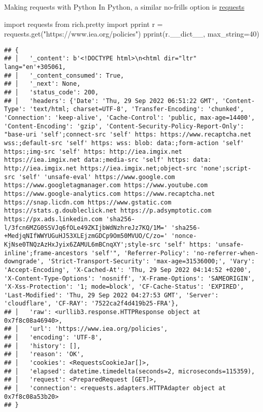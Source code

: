 \documentclass[
  10pt,
  ignorenonframetext,
  aspectratio=169]{beamer}
\newenvironment{Shaded}{\begin{snugshade}}{\end{snugshade}}
\newcommand{\DecValTok}[1]{\textcolor[rgb]{0.86,0.86,0.80}{#1}}
\newcommand{\ImportTok}[1]{\textcolor[rgb]{0.80,0.80,0.80}{#1}}
\newcommand{\NormalTok}[1]{\textcolor[rgb]{0.80,0.80,0.80}{#1}}
\newcommand{\OperatorTok}[1]{\textcolor[rgb]{0.94,0.94,0.82}{#1}}
\newcommand{\StringTok}[1]{\textcolor[rgb]{0.80,0.58,0.58}{#1}}
\begin{document}
\begin{frame}[fragile]{Making requests with Python}
\protect\hypertarget{making-requests-with-python}{}
In Python, a similar no-frills option is
\href{https://requests.readthedocs.io/en/latest/user/quickstart/}{requests}

\scriptsize

\begin{Shaded}
\begin{Highlighting}[]
\ImportTok{import}\NormalTok{ requests}
\ImportTok{from}\NormalTok{ rich.pretty }\ImportTok{import}\NormalTok{ pprint}
\NormalTok{r }\OperatorTok{=}\NormalTok{ requests.get(}\StringTok{"https://www.iea.org/policies"}\NormalTok{)}
\NormalTok{pprint(r.\_\_dict\_\_, max\_string}\OperatorTok{=}\DecValTok{40}\NormalTok{)}
\end{Highlighting}
\end{Shaded}

\begin{verbatim}
## {
## │   '_content': b'<!DOCTYPE html>\n<html dir="ltr" lang="en'+305061,
## │   '_content_consumed': True,
## │   '_next': None,
## │   'status_code': 200,
## │   'headers': {'Date': 'Thu, 29 Sep 2022 06:51:22 GMT', 'Content-Type': 'text/html; charset=UTF-8', 'Transfer-Encoding': 'chunked', 'Connection': 'keep-alive', 'Cache-Control': 'public, max-age=14400', 'Content-Encoding': 'gzip', 'Content-Security-Policy-Report-Only': "base-uri 'self';connect-src 'self' https: https://www.recaptcha.net wss:;default-src 'self' https: wss: blob: data:;form-action 'self' https:;img-src 'self' https: http://iea.imgix.net https://iea.imgix.net data:;media-src 'self' https: data: http://iea.imgix.net https://iea.imgix.net;object-src 'none';script-src 'self' 'unsafe-eval' https://www.google.com https://www.googletagmanager.com https://www.youtube.com https://www.google-analytics.com https://www.recaptcha.net https://snap.licdn.com https://www.gstatic.com https://stats.g.doubleclick.net https://p.adsymptotic.com https://px.ads.linkedin.com 'sha256-l/3fcn6MZG0SSVJq6fOLe49ZKIjbWdNzhreJz7KQ/1M=' 'sha256-+MedjqNIfWWYUGuHJ53XLEjzmGDCp9Om50MVUO/C/zo=' 'nonce-KjNse0TNQzAzHxJyix6ZAMUL6mBCnqXY';style-src 'self' https: 'unsafe-inline';frame-ancestors 'self'", 'Referrer-Policy': 'no-referrer-when-downgrade', 'Strict-Transport-Security': 'max-age=31536000;', 'Vary': 'Accept-Encoding', 'X-Cached-At': 'Thu, 29 Sep 2022 04:14:52 +0200', 'X-Content-Type-Options': 'nosniff', 'X-Frame-Options': 'SAMEORIGIN', 'X-Xss-Protection': '1; mode=block', 'CF-Cache-Status': 'EXPIRED', 'Last-Modified': 'Thu, 29 Sep 2022 04:27:53 GMT', 'Server': 'cloudflare', 'CF-RAY': '7522ca2f4d419b25-FRA'},
## │   'raw': <urllib3.response.HTTPResponse object at 0x7f8c08a46940>,
## │   'url': 'https://www.iea.org/policies',
## │   'encoding': 'UTF-8',
## │   'history': [],
## │   'reason': 'OK',
## │   'cookies': <RequestsCookieJar[]>,
## │   'elapsed': datetime.timedelta(seconds=2, microseconds=115359),
## │   'request': <PreparedRequest [GET]>,
## │   'connection': <requests.adapters.HTTPAdapter object at 0x7f8c08a53b20>
## }
\end{verbatim}
\end{frame}
\end{document}

